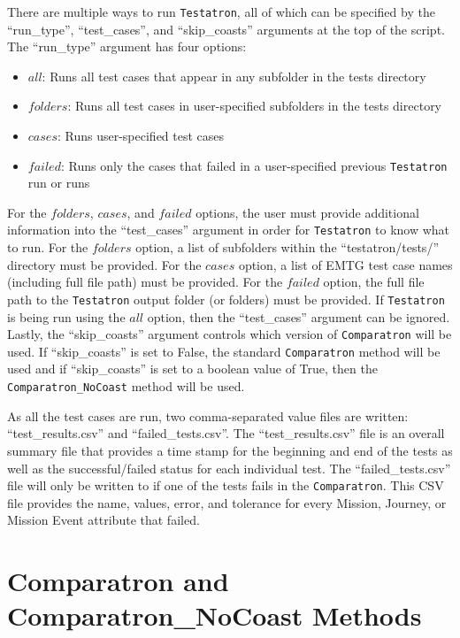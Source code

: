 There are multiple ways to run \texttt{Testatron}, all of which can be specified by the ``run\_type'', ``test\_cases'', and ``skip\_coasts'' arguments at the top of the script. The ``run\_type'' argument has four options:
\begin{itemize}[label=$\bullet$]
	\item $all$: Runs all test cases that appear in any subfolder in the tests directory
	\item $folders$: Runs all test cases in user-specified subfolders in the tests directory
	\item $cases$: Runs user-specified test cases
	\item $failed$: Runs only the cases that failed in a user-specified previous \texttt{Testatron} run or runs
\end{itemize}
For the $folders$, $cases$, and $failed$ options, the user must provide additional information into the ``test\_cases'' argument in order for \texttt{Testatron} to know what to run. For the $folders$ option, a list of subfolders within the ``testatron/tests/'' directory must be provided. For the $cases$ option, a list of \ac{EMTG} test case names (including full file path) must be provided. For the $failed$ option, the full file path to the \texttt{Testatron} output folder (or folders) must be provided. If \texttt{Testatron} is being run using the $all$ option, then the ``test\_cases'' argument can be ignored. Lastly, the ``skip\_coasts'' argument controls which version of \texttt{Comparatron} will be used. If ``skip\_coasts'' is set to False, the standard \texttt{Comparatron} method will be used and if ``skip\_coasts'' is set to a boolean value of True, then the \texttt{Comparatron\_NoCoast} method will be used.

As all the test cases are run, two comma-separated value files are written: ``test\_results.csv'' and ``failed\_tests.csv''. The ``test\_results.csv'' file is an overall summary file that provides a time stamp for the beginning and end of the tests as well as the successful/failed status for each individual test. The ``failed\_tests.csv'' file will only be written to if one of the tests fails in the \texttt{Comparatron}. This CSV file provides the name, values, error, and tolerance for every Mission, Journey, or Mission Event attribute that failed. 

\section{Comparatron and Comparatron\_NoCoast Methods}
\label{comparatronmethod}

